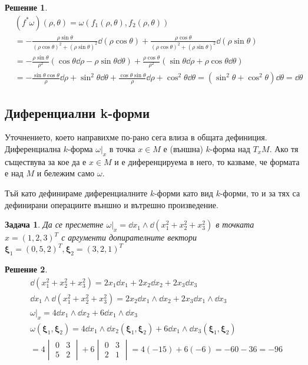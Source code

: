 \documentclass[12pt]{article}
\newtheorem{problem}{Задача}
\newtheorem*{solution*}{Решение}
\newcommand\myxi[0]{\boldsymbol{\xi}}
\begin{document}
\begin{large}
\begin{solution*}
  \begin{align*}
    &(f^* \omega)(\rho, \theta) = \omega(f_1(\rho,\theta),f_2(\rho,\theta)) \\
    &= - \frac{\rho \sin \theta}{(\rho \cos \theta)^2+(\rho \sin \theta)^2} \dd (\rho \cos \theta) + \frac{\rho \cos \theta}{(\rho \cos \theta)^2+(\rho \sin \theta)^2} \dd (\rho \sin \theta) \\
    &=- \frac{\rho \sin \theta}{\rho^2} (\cos \theta \dd \rho - \rho \sin \theta \dd \theta)+\frac{\rho \cos \theta}{\rho^2}(\sin \theta \dd \rho + \rho \cos \theta \dd \theta) \\
    &=-\frac{\sin \theta \cos \theta}{\rho} \dd \rho + \sin^2 \theta \dd \theta + \frac{\cos \theta \sin \theta}{\rho} \dd \rho + \cos^2 \theta \dd \theta  = (\sin^2 \theta + \cos^2 \theta) \dd \theta = \dd \theta
  \end{align*}
\end{solution*}

\subsection{Диференциални k-форми}

Уточнението, което направихме по-рано сега влиза в общата дефиниция.
Диференциална $k$-форма $\omega \vert_x$ в точка $x \in M$ е (външна) $k$-форма над $T_x M$. Ако тя съществува за кое да е $x \in M$ и е диференцируема в него, то казваме, че формата е над $M$ и бележим само $\omega$.

Тъй като дефинираме диференциалните $k$-форми като вид $k$-форми, то и за тях са дефинирани операциите външно и вътрешно произведение.

\begin{problem}
  Да се пресметне $\omega \vert_x= \dd x_1 \wedge \dd (x_1^2+x_2^2+x_3^2)$ в точката $x=(1,2,3)^T$ с аргументи допирателните вектори $\myxi_1=(0,5,2)^T,\myxi_2=(3,2,1)^T$
\end{problem}

\begin{solution*}
  \begin{align*}
    &\dd (x_1^2+x_2^2+x_3^2) = 2x_1 \dd x_1 + 2x_2 \dd x_2 + 2x_3 \dd x_3 \\
    &\dd x_1 \wedge \dd (x_1^2+x_2^2+x_3^2) = 2x_2 \dd x_1 \wedge \dd x_2 + 2x_3 \dd x_1 \wedge \dd x_3 \\
    &\omega \vert_x = 4\dd x_1 \wedge \dd x_2 + 6\dd x_1 \wedge \dd x_3 \\
    &\omega(\myxi_1,\myxi_2) = 4\dd x_1 \wedge \dd x_2(\myxi_1,\myxi_2) + 6\dd x_1 \wedge \dd x_3(\myxi_1,\myxi_2) \\
    &=4
    \begin{vmatrix}
      0 &3 \\
      5 &2
    \end{vmatrix}  + 6
    \begin{vmatrix}
    0 &3 \\
    2 &1
    \end{vmatrix} = 4(-15)+6(-6)=-60-36=-96 \\
    \end{align*}
\end{solution*}


\end{large}
\end{document}
